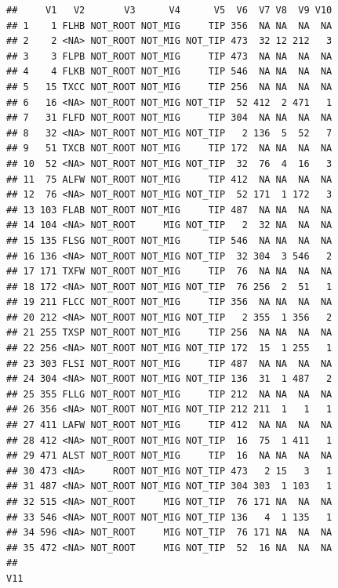 \documentclass[]{article}
\begin{document}
\begin{verbatim}
##     V1   V2       V3      V4      V5  V6  V7 V8  V9 V10
## 1    1 FLHB NOT_ROOT NOT_MIG     TIP 356  NA NA  NA  NA
## 2    2 <NA> NOT_ROOT NOT_MIG NOT_TIP 473  32 12 212   3
## 3    3 FLPB NOT_ROOT NOT_MIG     TIP 473  NA NA  NA  NA
## 4    4 FLKB NOT_ROOT NOT_MIG     TIP 546  NA NA  NA  NA
## 5   15 TXCC NOT_ROOT NOT_MIG     TIP 256  NA NA  NA  NA
## 6   16 <NA> NOT_ROOT NOT_MIG NOT_TIP  52 412  2 471   1
## 7   31 FLFD NOT_ROOT NOT_MIG     TIP 304  NA NA  NA  NA
## 8   32 <NA> NOT_ROOT NOT_MIG NOT_TIP   2 136  5  52   7
## 9   51 TXCB NOT_ROOT NOT_MIG     TIP 172  NA NA  NA  NA
## 10  52 <NA> NOT_ROOT NOT_MIG NOT_TIP  32  76  4  16   3
## 11  75 ALFW NOT_ROOT NOT_MIG     TIP 412  NA NA  NA  NA
## 12  76 <NA> NOT_ROOT NOT_MIG NOT_TIP  52 171  1 172   3
## 13 103 FLAB NOT_ROOT NOT_MIG     TIP 487  NA NA  NA  NA
## 14 104 <NA> NOT_ROOT     MIG NOT_TIP   2  32 NA  NA  NA
## 15 135 FLSG NOT_ROOT NOT_MIG     TIP 546  NA NA  NA  NA
## 16 136 <NA> NOT_ROOT NOT_MIG NOT_TIP  32 304  3 546   2
## 17 171 TXFW NOT_ROOT NOT_MIG     TIP  76  NA NA  NA  NA
## 18 172 <NA> NOT_ROOT NOT_MIG NOT_TIP  76 256  2  51   1
## 19 211 FLCC NOT_ROOT NOT_MIG     TIP 356  NA NA  NA  NA
## 20 212 <NA> NOT_ROOT NOT_MIG NOT_TIP   2 355  1 356   2
## 21 255 TXSP NOT_ROOT NOT_MIG     TIP 256  NA NA  NA  NA
## 22 256 <NA> NOT_ROOT NOT_MIG NOT_TIP 172  15  1 255   1
## 23 303 FLSI NOT_ROOT NOT_MIG     TIP 487  NA NA  NA  NA
## 24 304 <NA> NOT_ROOT NOT_MIG NOT_TIP 136  31  1 487   2
## 25 355 FLLG NOT_ROOT NOT_MIG     TIP 212  NA NA  NA  NA
## 26 356 <NA> NOT_ROOT NOT_MIG NOT_TIP 212 211  1   1   1
## 27 411 LAFW NOT_ROOT NOT_MIG     TIP 412  NA NA  NA  NA
## 28 412 <NA> NOT_ROOT NOT_MIG NOT_TIP  16  75  1 411   1
## 29 471 ALST NOT_ROOT NOT_MIG     TIP  16  NA NA  NA  NA
## 30 473 <NA>     ROOT NOT_MIG NOT_TIP 473   2 15   3   1
## 31 487 <NA> NOT_ROOT NOT_MIG NOT_TIP 304 303  1 103   1
## 32 515 <NA> NOT_ROOT     MIG NOT_TIP  76 171 NA  NA  NA
## 33 546 <NA> NOT_ROOT NOT_MIG NOT_TIP 136   4  1 135   1
## 34 596 <NA> NOT_ROOT     MIG NOT_TIP  76 171 NA  NA  NA
## 35 472 <NA> NOT_ROOT     MIG NOT_TIP  52  16 NA  NA  NA
##                                                                                                                                                                                                                                                                                                                                                                                                                                   V11

\end{verbatim}
\end{document}
